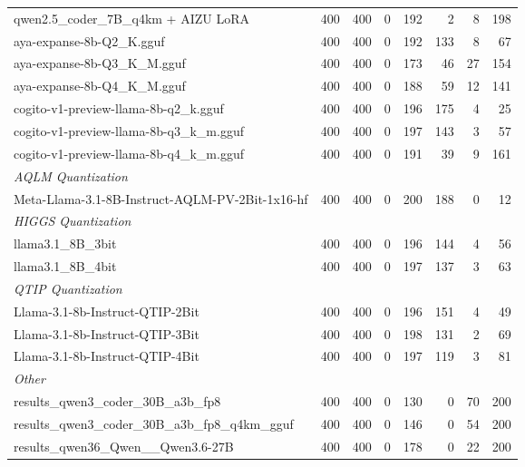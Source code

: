 \begin{table}[htbp]
{\begin{tabular}{lrrrrrrr}
    qwen2.5\_coder\_7B\_q4km + AIZU LoRA & 400 & 400 & 0 & 192 & 2 & 8 & 198 \\
    aya-expanse-8b-Q2\_K.gguf & 400 & 400 & 0 & 192 & 133 & 8 & 67 \\
    aya-expanse-8b-Q3\_K\_M.gguf & 400 & 400 & 0 & 173 & 46 & 27 & 154 \\
    aya-expanse-8b-Q4\_K\_M.gguf & 400 & 400 & 0 & 188 & 59 & 12 & 141 \\
    cogito-v1-preview-llama-8b-q2\_k.gguf & 400 & 400 & 0 & 196 & 175 & 4 & 25 \\
    cogito-v1-preview-llama-8b-q3\_k\_m.gguf & 400 & 400 & 0 & 197 & 143 & 3 & 57 \\
    cogito-v1-preview-llama-8b-q4\_k\_m.gguf & 400 & 400 & 0 & 191 & 39 & 9 & 161 \\
    \midrule
    \multicolumn{8}{l}{\textit{AQLM Quantization}} \\
    \midrule
    Meta-Llama-3.1-8B-Instruct-AQLM-PV-2Bit-1x16-hf & 400 & 400 & 0 & 200 & 188 & 0 & 12 \\
    \midrule
    \multicolumn{8}{l}{\textit{HIGGS Quantization}} \\
    \midrule
    llama3.1\_8B\_3bit & 400 & 400 & 0 & 196 & 144 & 4 & 56 \\
    llama3.1\_8B\_4bit & 400 & 400 & 0 & 197 & 137 & 3 & 63 \\
    \midrule
    \multicolumn{8}{l}{\textit{QTIP Quantization}} \\
    \midrule
    Llama-3.1-8b-Instruct-QTIP-2Bit & 400 & 400 & 0 & 196 & 151 & 4 & 49 \\
    Llama-3.1-8b-Instruct-QTIP-3Bit & 400 & 400 & 0 & 198 & 131 & 2 & 69 \\
    Llama-3.1-8b-Instruct-QTIP-4Bit & 400 & 400 & 0 & 197 & 119 & 3 & 81 \\
    \midrule
    \multicolumn{8}{l}{\textit{Other}} \\
    \midrule
    results\_qwen3\_coder\_30B\_a3b\_fp8 & 400 & 400 & 0 & 130 & 0 & 70 & 200 \\
    results\_qwen3\_coder\_30B\_a3b\_fp8\_q4km\_gguf & 400 & 400 & 0 & 146 & 0 & 54 & 200 \\
    results\_qwen36\_Qwen\_\_Qwen3.6-27B & 400 & 400 & 0 & 178 & 0 & 22 & 200 \\
    \bottomrule
  \end{tabular}
  }
\end{table}

